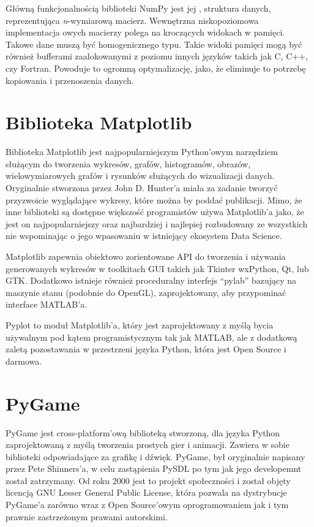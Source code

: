 Główną funkcjonalnością biblioteki NumPy jest jej , struktura danych, reprezentująca \textit{n}-wymiarową macierz. Wewnętrzna niskopoziomowa implementacja owych macierzy polega na kroczących widokach w pamięci. Takowe dane muszą być homogenicznego typu. Takie widoki pamięci mogą być również bufferami zaalokowanymi z poziomu innych języków takich jak C, C++, czy Fortran. Powoduje to ogromną optymalizację, jako, że eliminuje to potrzebę kopiowania i przenoszenia danych.



\section{Biblioteka Matplotlib}
\label{section:matplotlib}

Biblioteka Matplotlib \cite{MatplotlibDocumentation} \cite{Matplotlib30Cookbook} \cite{PythonForDataAnalysis} \cite{WikipediaMatplotlib} jest najpopularniejszym Python'owym narzędziem służącym do tworzenia wykresów, grafów, histogramów, obrazów, wielowymiarowych grafów i rysunków służących do wizualizacji danych. Oryginalnie stworzona przez John D. Hunter'a miała za zadanie tworzyć przyzwoicie wyglądające wykresy, które można by poddać publikacji. Mimo, że inne biblioteki są dostępne większość programistów używa Matplotlib'a jako, że jest on najpopularniejszy oraz najbardziej i najlepiej rozbudowany ze wszystkich nie wspominając o jego wpasowaniu w istniejący ekosystem Data Science.

Matplotlib zapewnia obiektowo zorientowane API do tworzenia i używania generowanych wykresów w toolkitach GUI takich jak Tkinter wxPython, Qt, lub GTK. Dodatkowo istnieje również proceduralny interfejs ``pylab'' bazujący na maszynie stanu (podobnie do OpenGL), zaprojektowany, aby przypominać interface MATLAB'a.

Pyplot to moduł Matplotlib'a, który jest zaprojektowany z myślą bycia używalnym pod kątem programistycznym tak jak MATLAB, ale z dodatkową zaletą pozostawania w przestrzeni języka Python, która jest Open Source i darmowa.


\section{PyGame}
\label{section:pygame}

PyGame \cite{PyGameDocumentation} \cite{WikipediaPyGame} jest cross-platform'ową biblioteką stworzoną, dla języka Python zaprojektowaną z myślą tworzenia prostych gier i animacji. Zawiera w sobie biblioteki odpowiadające za grafikę i dźwięk.
PyGame, był oryginalnie napisany przez Pete Shinners'a, w celu zastąpienia PySDL po tym jak jego developemnt został zatrzymany. Od roku 2000 jest to projekt społeczności i został objęty licencją GNU Lesser General Public License, która pozwala na dystrybucje PyGame'a zarówno wraz z Open Source'owym oprogramowaniem jak i tym prawnie zastrzeżonym prawami autorskimi.




